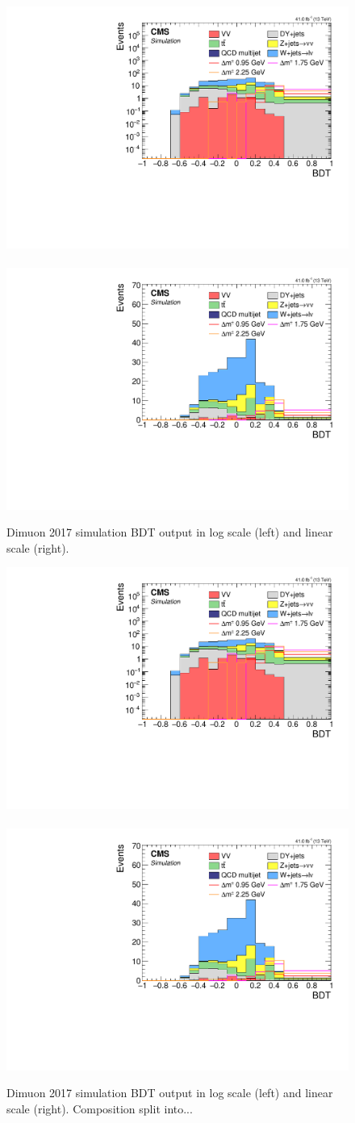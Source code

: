 \begin{figure}[!htb]
\centering
\includegraphics[width=0.48\linewidth]{plots/dilepton_muons_2017/none_custom_dilepBDTCorrJetNoMultIso10Dr0.6_log.pdf} \,
\includegraphics[width=0.48\linewidth]{plots/dilepton_muons_2017/none_custom_dilepBDTCorrJetNoMultIso10Dr0.6.pdf} \\


\caption[Dimuon simulation BDT output]{Dimuon 2017 simulation BDT output in log scale (left) and linear scale (right).}
\label{fig:dimuon-bdt-sim-output}
\end{figure}


\begin{figure}[!htb]
\centering
\includegraphics[width=0.48\linewidth]{plots/dilepton_muons_2017/none_custom_dilepBDTCorrJetNoMultIso10Dr0.6_log.pdf} \,
\includegraphics[width=0.48\linewidth]{plots/dilepton_muons_2017/none_custom_dilepBDTCorrJetNoMultIso10Dr0.6.pdf} \\


\caption[Dimuon simulation BDT output jetty tautau]{Dimuon 2017 simulation BDT output in log scale (left) and linear scale (right).  Composition split into...}
\label{fig:dimuon-bdt-sim-output-jetty-tautau}
\end{figure}



